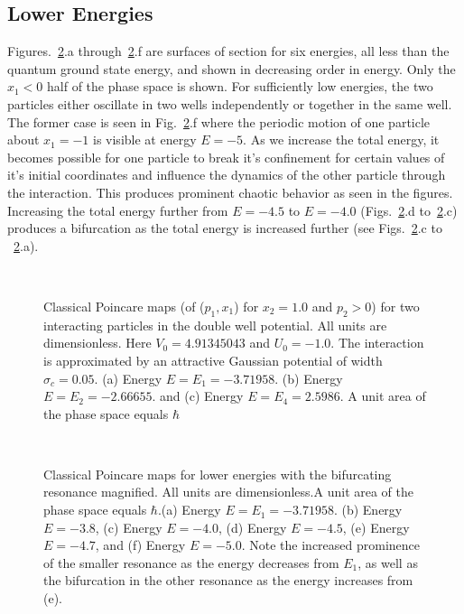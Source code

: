 %
%
\subsection{Lower Energies}
%
%
Figures.~\ref{fig:bifurcation}.a through~\ref{fig:bifurcation}.f are surfaces of section for six energies,  all less than the quantum ground state energy, and shown in decreasing order in energy.  Only the $x_1<0$ half of the phase space is shown. For sufficiently low energies, the two particles either oscillate in two wells independently or together in the same well. The former case is seen in Fig.~\ref{fig:bifurcation}.f where the periodic motion of one particle about $x_1 = -1$ is visible at energy $E = -5$. As we increase the total energy, it becomes possible for one particle to break it's confinement for certain values of it's initial coordinates and influence the dynamics of the other particle through the interaction. This produces prominent chaotic behavior as seen in the figures. Increasing the total energy further from $E = -4.5$ to $E = -4.0$ (Figs.~\ref{fig:bifurcation}.d to~\ref{fig:bifurcation}.c) produces a bifurcation as the total energy is increased further (see Figs.~\ref{fig:bifurcation}.c to ~\ref{fig:bifurcation}.a).

\begin{figure} 
\ 
\caption{Classical Poincare maps (of  ($p_1,x_1$) for $x_2=1.0$ and $p_2>0$) for two interacting particles in the double well potential. All units are dimensionless. Here $V_0 = 4.91345043$ and $U_0 = -1.0 $. The interaction is approximated by an attractive Gaussian  potential of width $\sigma_c = 0.05$.  (a) Energy $E=E_1=-3.71958$. (b) Energy $E=E_2=-2.66655$. and (c) Energy $E=E_4=2.5986$. A unit area of the phase space equals $\hbar$}
\label{fig:classicalpncr}
\end{figure}

\begin{figure} 
\ 
\caption{Classical Poincare maps for lower energies with the bifurcating resonance magnified. All units are dimensionless.A unit area of the phase space equals $\hbar$.(a) Energy $E=E_1=-3.71958$. (b) Energy $E=-3.8$, (c) Energy $E=-4.0$, (d) Energy $E=-4.5$, (e) Energy $E=-4.7$, and (f) Energy $E=-5.0$. Note the increased prominence of the smaller resonance as the energy decreases from $E_1$, as well as the bifurcation in the other resonance as the energy increases from (e).}
\label{fig:bifurcation}
\end{figure}
%
%
